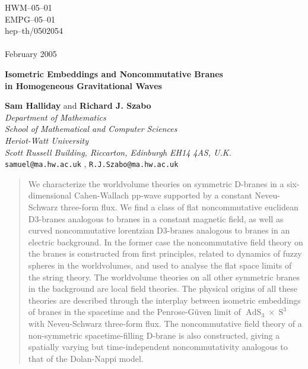 \documentclass[11pt,a4paper]{article}
\DeclareMathOperator{\AdS}{AdS}
\DeclareMathOperator{\Sphere}{S}
\let\S\Sphere
\begin{document}
\begin{titlepage}
\begin{flushright}

\baselineskip=12pt

HWM--05--01\\
EMPG--05--01\\
hep--th/0502054\\
\hfill{ }\\
February 2005
\end{flushright}

\begin{center}

\vspace{2cm}

\baselineskip=24pt

{\Large\bf Isometric Embeddings and Noncommutative Branes\\ in
  Homogeneous Gravitational Waves}

\baselineskip=14pt

\vspace{1cm}

{\bf Sam Halliday} and {\bf Richard J. Szabo}
\\[4mm]
{\it Department of Mathematics\\ School of Mathematical and Computer
  Sciences\\ Heriot-Watt University\\ Scott Russell Building,
  Riccarton, Edinburgh EH14 4AS, U.K.}
\\{\tt samuel@ma.hw.ac.uk} , {\tt R.J.Szabo@ma.hw.ac.uk}
\\[40mm]

\end{center}

\begin{abstract}

\baselineskip=12pt

We characterize the worldvolume theories on symmetric D-branes in a
six-dimensional Cahen-Wallach pp-wave supported by
a constant Neveu-Schwarz three-form flux. We find a class of flat
noncommutative euclidean D3-branes analogous to branes in a constant
magnetic field, as well as curved noncommutative lorentzian D3-branes
analogous to branes in an electric background. In the former case the
noncommutative field theory on the branes is constructed from first
principles, related to dynamics of fuzzy spheres in the worldvolumes,
and used to analyse the flat space limits of the string theory. The
worldvolume theories on all other symmetric branes in the background
are local field theories. The physical origins of all these theories are
described through the interplay between isometric embeddings of branes
in the spacetime and the Penrose-G\"uven limit of $\AdS_3\times\S^3$
with Neveu-Schwarz three-form flux. The noncommutative field theory of
a non-symmetric spacetime-filling D-brane is also constructed, giving
a spatially varying but time-independent noncommutativity analogous to
that of the Dolan-Nappi model.

\end{abstract}

\end{titlepage}
\setcounter{page}{2}
\end{document}
